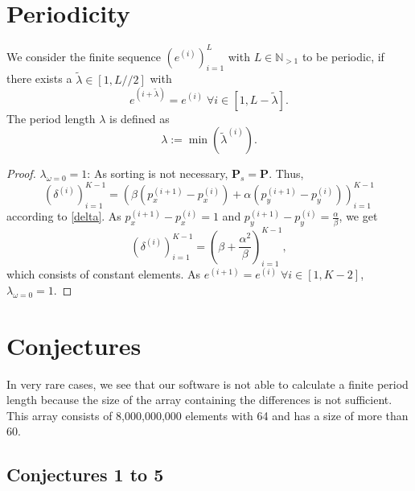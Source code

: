 \documentclass[11pt]{article}
\theoremstyle{remark}
\begin{document}
\section{Periodicity}

We consider the finite sequence $\left(e^{(i)}\right)_{i=1}^{L}$ with $L \in \mathbb{N}_{>1}$ to be periodic, if there exists a $\tilde{\lambda} \in [1, L//2]$ with 
%
\begin{equation}
e^{(i+\tilde{\lambda})} = e^{(i)} \; \forall i \in [1, L-\tilde{\lambda}].
\end{equation}
%
The period length $\lambda$ is defined as
%
\begin{equation}
\lambda := \min\left(\tilde{\lambda}^{(i)} \right).
\end{equation}
%
\begin{proof}
$\lambda_{\omega = 0} = 1$: As sorting is not necessary, $\mathbf{P}_s = \mathbf{P}$. Thus,
%
\begin{equation}
\left(\delta^{(i)}\right)_{i=1}^{K-1} = \left(\beta \left(p_x^{(i+1)} - p_x^{(i)}\right) + \alpha \left(p_y^{(i+1)} - p_y^{(i)}\right)\right)_{i=1}^{K-1}
\end{equation}
%
according to \ref{delta}. As $p_x^{(i+1)} - p_x^{(i)} = 1$ and $p_y^{(i+1)} - p_y^{(i)} = \frac{\alpha}{\beta}$, we get
\begin{equation}
\left(\delta^{(i)}\right)_{i=1}^{K-1} = \left(\beta + \frac{\alpha^2}{\beta}\right)_{i=1}^{K-1},
\end{equation}
%
which consists of constant elements. As $e^{(i+1)} = e^{(i)} \; \forall i \in [1, K-2]$, $\lambda_{\omega = 0} = 1$.
\end{proof}

\section{Conjectures}

In very rare cases, we see that our \langc software is not able to calculate a finite period length because the size of the array containing the differences is not sufficient. This array consists of 8,000,000,000 elements with \SI{64}{\bit} and has a size of more than \SI{60}{\gigabyte}.

\subsection{Conjectures 1 to 5}
\end{document}
